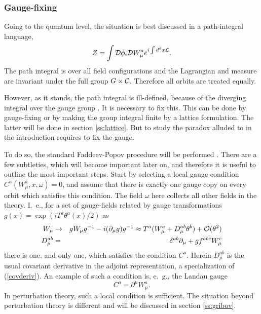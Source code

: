 \documentclass[final,12pt]{article}
\newcommand*{\La}{{\cal{L}}}
\newcommand*{\no}{\noindent}
\newcommand*{\bea}{\begin{eqnarray}}
\newcommand*{\eea}{\end{eqnarray}}
\newcommand*{\be}{\begin{equation}}
\newcommand*{\ee}{\end{equation}}
\newcommand*{\pd}{\partial}
\newcommand*{\pdm}{\pd_{\mu}}
\newcommand*{\pref}[1]{(\ref{#1})}
\newcommand*{\nn}{\nonumber}
\newcommand*{\1}{1\!\!\!\bot}
\newcommand*{\cd}{{\cal D}}
\newcommand*{\pint}{\int\cd}
\begin{document}
\subsubsection{Gauge-fixing}\label{sss:gf}

Going to the quantum level, the situation is best discussed in a path-integral language,
\be
Z=\pint\phi_i\cd W_\mu^a e^{i\int d^d x\La}\nn.
\ee
\no The path integral is over all field configurations and the Lagrangian and measure are invariant under the full group $G\times{\cal C}$. Therefore all orbits are treated equally.

However, as it stands, the path integral is ill-defined, because of the diverging integral over the gauge group \cite{Bohm:2001yx}. It is necessary to fix this. This can be done by gauge-fixing or by making the group integral finite by a lattice formulation. The latter will be done in section \ref{ss:lattice}. But to study the paradox alluded to in the introduction requires to fix the gauge.

To do so, the standard Faddeev-Popov procedure will be performed \cite{Bohm:2001yx}. There are a few subtleties, which will become important later on, and therefore it is useful to outline the most important steps. Start by selecting a local gauge condition $C^a(W_\mu^a,x,\omega)=0$, and assume that there is exactly one gauge copy on every orbit which satisfies this condition. The field $\omega$ here collects all other fields in the theory. I.\ e., for a set of gauge-fields related by gauge transformations $g(x)=\exp(i T^a\theta^a(x)/2)$ as
\bea
W_\mu&\to& gW_\mu g^{-1}-i(\pdm g) g^{-1}\approx T^a(W_\mu^a+D_\mu^{ab}\theta^b)+{\cal O}(\theta^{2})\label{gauget}\\
D_\mu^{ab}&=&\delta^{ab}\pdm+gf^{abc}W_\mu^c\nn
\eea
there is one, and only one, which satisfies the condition $C^a$. Herein $D_\mu^{ab}$ is the usual covariant derivative in the adjoint representation, a specialization of \pref{covderiv}. An example of such a condition is, e.\ g., the Landau gauge 
\be
C^a=\pd^\mu W^a_\mu\label{landaug}.
\ee
\no In perturbation theory, such a local condition is sufficient. The situation beyond perturbation theory is different and will be discussed in section \ref{ss:gribov}.
\end{document}
